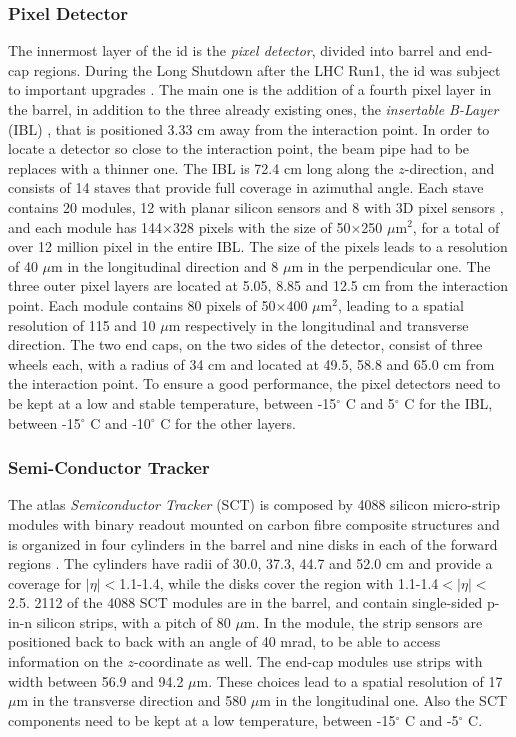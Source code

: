 \subsubsection*{Pixel Detector}
The innermost layer of the \gls{id} is the \textit{pixel detector}, divided into barrel and end-cap regions. During the Long Shutdown after the LHC Run1, the \gls{id} was subject to important upgrades \cite{Potamianos:2016ptf}. The main one is the addition of a fourth pixel layer in the barrel, in addition to the three already existing ones, the \textit{insertable B-Layer} (IBL) \cite{Capeans:1291633}, that is positioned 3.33 cm away from the interaction point. In order to locate a detector so close to the interaction point, the beam pipe had to be replaces with a thinner one. The IBL is 72.4 cm long along the $z$-direction, and consists of 14 staves that provide full coverage in azimuthal angle. Each stave contains 20 modules, 12 with planar silicon sensors and 8 with 3D pixel sensors \cite{1748-0221-7-11-P11010}, and each module has 144$\times$328 pixels with the size of 50$\times$250 $\mu$m$^2$, for a total of over 12 million pixel in the entire IBL. The size of the pixels leads to a resolution of 40 $\mu$m in the longitudinal direction and 8 $\mu$m in the perpendicular one. The three outer pixel layers are located at 5.05, 8.85 and 12.5 cm from the interaction point. Each module contains 80 pixels of 50$\times$400 $\mu$m$^2$, leading to a spatial resolution of 115 and 10 $\mu$m respectively in the longitudinal and transverse direction. 
The two end caps, on the two sides of the detector, consist of three wheels each, with a radius of 34 cm and located at 49.5, 58.8 and 65.0 cm from the interaction point. 
To ensure a good performance, the pixel detectors need to be kept at a low and stable temperature, between -15$^{\circ}$ C and 5$^{\circ}$ C for the IBL, between -15$^{\circ}$ C and -10$^{\circ}$ C for the other layers.

\subsubsection*{Semi-Conductor Tracker}
The \gls{atlas} \textit{Semiconductor Tracker} (SCT) is composed by 4088 silicon micro-strip modules with binary readout mounted on carbon fibre composite structures and is organized in four cylinders in the barrel and nine disks in each of the forward regions \cite{Jackson:sct}. The cylinders have  radii of 30.0, 37.3, 44.7 and 52.0 cm and provide a coverage for $|\eta|<$1.1-1.4, while the disks cover the region with 1.1-1.4$<|\eta|<$2.5. 
2112 of the 4088 SCT modules are in the barrel, and contain single-sided p-in-n silicon strips, with a pitch of 80 $\mu$m. In the module, the strip sensors are positioned back to back with an angle of 40 mrad, to be able to access information on the $z$-coordinate as well. The end-cap modules use strips with width between 56.9 and 94.2 $\mu$m. These choices lead to a spatial resolution of 17 $\mu$m in the transverse direction and 580 $\mu$m in the longitudinal one. Also the SCT components need to be kept at a low temperature, between -15$^{\circ}$ C and -5$^{\circ}$ C.


